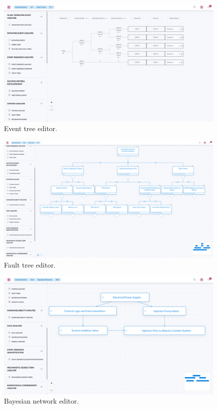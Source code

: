 \begin{figure}
  \centering
  \includegraphics[width=\textwidth]{4_proposed_solution/web_app/figures/et.png}
  \caption{Event tree editor.}
  \label{fig:et_editor}
\end{figure}

\begin{figure}
  \centering
  \includegraphics[width=\textwidth]{4_proposed_solution/web_app/figures/ft.png}
  \caption{Fault tree editor.}
  \label{fig:ft_editor}
\end{figure}

\begin{figure}
  \centering
  \includegraphics[width=\textwidth]{4_proposed_solution/web_app/figures/bn.png}
  \caption{Bayesian network editor.}
  \label{fig:bn_editor}
\end{figure}